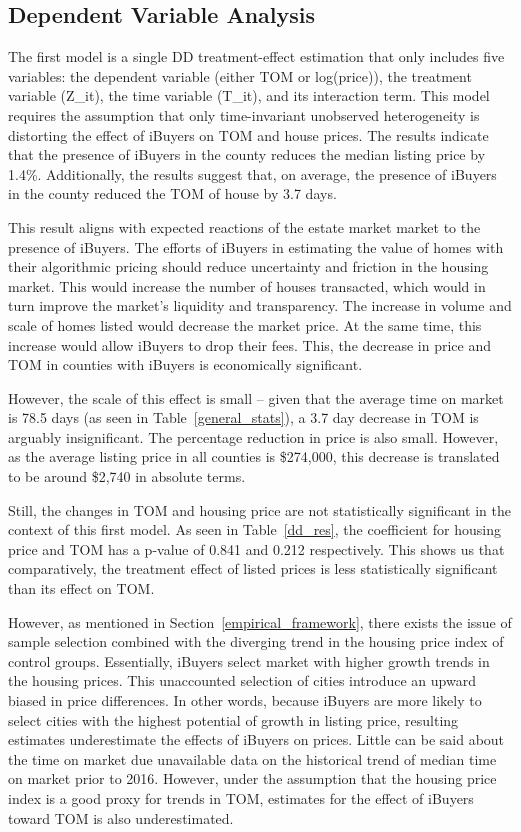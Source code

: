 ﻿\subsection{Dependent Variable Analysis}
The first model is a single DD treatment-effect estimation that only includes five variables: the dependent variable (either TOM or log(price)), the treatment variable (Z\_it), the time variable (T\_it), and its interaction term. This model requires the assumption that only time-invariant unobserved heterogeneity is distorting the effect of iBuyers on TOM and house prices. The results indicate that the presence of iBuyers in the county reduces the median listing price by 1.4\%. Additionally, the results suggest that, on average, the presence of iBuyers in the county reduced the TOM of house by 3.7 days.  

This result aligns with expected reactions of the estate market market to the presence of iBuyers. The efforts of iBuyers in estimating the value of homes with their algorithmic pricing should reduce uncertainty and friction in the housing market. This would increase the number of houses transacted, which would in turn improve the market’s liquidity and transparency. The increase in volume and scale of homes listed would decrease the market price. At the same time, this increase would allow iBuyers to drop their fees. This, the decrease in price and TOM in counties with iBuyers is economically significant.  

However, the scale of this effect is small – given that the average time on market is 78.5 days (as seen in Table~\ref{general_stats}), a 3.7 day decrease in TOM is arguably insignificant. The percentage reduction in price is also small. However, as the average listing price in all counties is \$274,000, this decrease is translated to be around \$2,740 in absolute terms. 

Still, the changes in TOM and housing price are not statistically significant in the context of this first model. As seen in Table~\ref{dd_res}, the coefficient for housing price and TOM has a p-value of 0.841 and 0.212 respectively. This shows us that comparatively, the treatment effect of listed prices is less statistically significant than its effect on TOM.

However, as mentioned in Section~\ref{empirical_framework}, there exists the issue of sample selection combined with the diverging trend in the housing price index of control groups. Essentially, iBuyers select market with higher growth trends in the housing prices. This unaccounted selection of cities introduce an upward biased in price differences. In other words, because iBuyers are more likely to select cities with the highest potential of growth in listing price, resulting estimates underestimate the effects of iBuyers on prices. Little can be said about the time on market due unavailable data on the historical trend of median time on market prior to 2016. However, under the assumption that the housing price index is a good proxy for trends in TOM, estimates for the effect of iBuyers toward TOM is also underestimated.  

